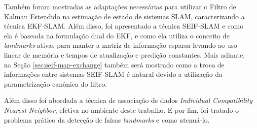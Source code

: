 Também foram mostradas as adaptações necessárias para utilizar o 
Filtro de Kalman Estendido na estimação de estado de sistemas SLAM, 
caracterizando a técnica EKF-SLAM. Além disso, foi apresentado a técnica 
SEIF-SLAM e como ela é baseada na formulação dual do EKF, e como 
ela utiliza o conceito de \textit{landmarks} ativas para manter a 
matriz de informação esparsa levando ao uso linear de memória e tempos 
de atualização e predição constantes. Mais adiante, na Seção \ref{sec:seif-map-exchange} também será mostrado como a troca de informações 
entre sistemas SEIF-SLAM é natural devido a utilização da parametrização 
canônica do filtro.

Além disso foi abordada a técnica de associação de dados 
\textit{Individual Compatibility Nearest Neighbor}, efetiva no ambiente deste trabalho. E por fim, foi tratado o problema prático da detecção 
de falsas \textit{landmarks} e como atenuá-lo.
